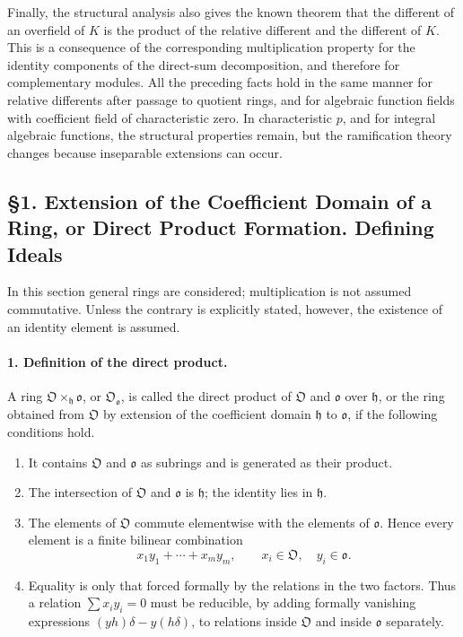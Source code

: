 \documentclass[11pt]{article}
\begin{document}
Finally, the structural analysis also gives the known theorem that the different of an overfield of $K$ is the product of the relative different and the different of $K$. This is a consequence of the corresponding multiplication property for the identity components of the direct-sum decomposition, and therefore for complementary modules. All the preceding facts hold in the same manner for relative differents after passage to quotient rings, and for algebraic function fields with coefficient field of characteristic zero. In characteristic $p$, and for integral algebraic functions, the structural properties remain, but the ramification theory changes because inseparable extensions can occur.

\subsection*{§1. Extension of the Coefficient Domain of a Ring, or Direct Product Formation. Defining Ideals}

In this section general rings are considered; multiplication is not assumed commutative. Unless the contrary is explicitly stated, however, the existence of an identity element is assumed.

\paragraph{1. Definition of the direct product.}
A ring $\mathfrak O\times_{\mathfrak h}\mathfrak o$, or $\mathfrak O_{\mathfrak o}$, is called the direct product of $\mathfrak O$ and $\mathfrak o$ over $\mathfrak h$, or the ring obtained from $\mathfrak O$ by extension of the coefficient domain $\mathfrak h$ to $\mathfrak o$, if the following conditions hold.

\begin{enumerate}
\item It contains $\mathfrak O$ and $\mathfrak o$ as subrings and is generated as their product.
\item The intersection of $\mathfrak O$ and $\mathfrak o$ is $\mathfrak h$; the identity lies in $\mathfrak h$.
\item The elements of $\mathfrak O$ commute elementwise with the elements of $\mathfrak o$. Hence every element is a finite bilinear combination
\[
        x_1y_1+\cdots+x_my_m,
        \qquad x_i\in\mathfrak O,
        \quad y_i\in\mathfrak o.
\]
\item Equality is only that forced formally by the relations in the two factors. Thus a relation $\sum x_iy_i=0$ must be reducible, by adding formally vanishing expressions $(yh)\delta-y(h\delta)$, to relations inside $\mathfrak O$ and inside $\mathfrak o$ separately.
\end{enumerate}
\end{document}

